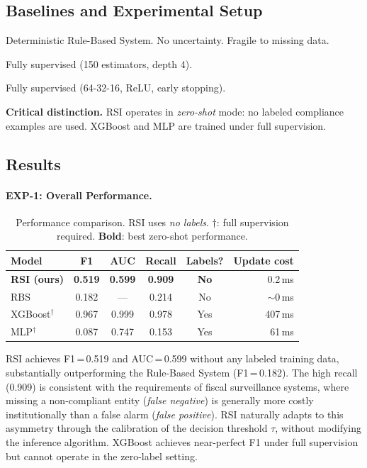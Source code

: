 \documentclass[letterpaper]{article}
\begin{document}
\subsection{Baselines and Experimental Setup}

\begin{description}[leftmargin=1.5em]
  \item[RBS] Deterministic Rule-Based System. No uncertainty.
        Fragile to missing data.
  \item[XGBoost] \citep{chen2016xgboost} Fully supervised
        (150 estimators, depth 4).
  \item[MLP] Fully supervised (64-32-16, ReLU, early stopping).
\end{description}

\noindent\textbf{Critical distinction.} RSI operates in
\emph{zero-shot} mode: no labeled compliance examples are used.
XGBoost and MLP are trained under full supervision.

\subsection{Results}

\paragraph{EXP-1: Overall Performance.}

\begin{table}[H]
\centering
\caption{Performance comparison. RSI uses \emph{no labels}.
         $\dagger$: full supervision required.
         \textbf{Bold}: best zero-shot performance.}
\label{tab:main}
\renewcommand{\arraystretch}{1.2}
\begin{tabular}{lccccr}
\toprule
\textbf{Model} & \textbf{F1} & \textbf{AUC} & \textbf{Recall}
  & \textbf{Labels?} & \textbf{Update cost} \\
\midrule
\textbf{RSI (ours)} & \textbf{0.519} & \textbf{0.599} & \textbf{0.909}
  & \textbf{No} & 0.2\,ms \\
RBS & 0.182 & --- & 0.214 & No & $\sim$0\,ms \\
XGBoost$^\dagger$ & 0.967 & 0.999 & 0.978 & Yes & 407\,ms \\
MLP$^\dagger$ & 0.087 & 0.747 & 0.153 & Yes & 61\,ms \\
\bottomrule
\end{tabular}
\end{table}

RSI achieves F1\,=\,0.519 and AUC\,=\,0.599 without any labeled
training data, substantially outperforming the Rule-Based System
(F1\,=\,0.182). The high recall (0.909) is consistent with the
requirements of fiscal surveillance systems, where missing a
non-compliant entity (\emph{false negative}) is generally more
costly institutionally than a false alarm (\emph{false positive}).
RSI naturally adapts to this asymmetry through the calibration of
the decision threshold $\tau$, without modifying the inference
algorithm. XGBoost achieves near-perfect F1 under full supervision
but cannot operate in the zero-label setting.
\end{document}
